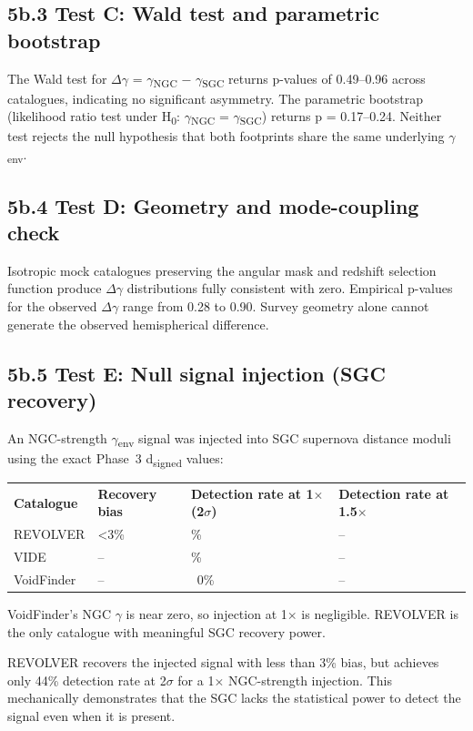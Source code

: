 \documentclass[11pt,a4paper]{article}
\begin{document}
\subsection{5b.3 Test C: Wald test and parametric bootstrap}
The Wald test for $\Delta$$\gamma$ = $\gamma$\textsubscript{NGC} $-$ $\gamma$\textsubscript{SGC} returns p-values of 0.49--0.96 across catalogues, indicating no significant asymmetry. The parametric bootstrap (likelihood ratio test under H\textsubscript{0}: $\gamma$\textsubscript{NGC} = $\gamma$\textsubscript{SGC}) returns p = 0.17--0.24. Neither test rejects the null hypothesis that both footprints share the same underlying $\gamma$\textsubscript{env}.

\subsection{5b.4 Test D: Geometry and mode-coupling check}
Isotropic mock catalogues preserving the angular mask and redshift selection function produce $\Delta$$\gamma$ distributions fully consistent with zero. Empirical p-values for the observed $\Delta$$\gamma$ range from 0.28 to 0.90. Survey geometry alone cannot generate the observed hemispherical difference.

\subsection{5b.5 Test E: Null signal injection (SGC recovery)}
An NGC-strength $\gamma$\textsubscript{env} signal was injected into SGC supernova distance moduli using the exact Phase~3 d\textsubscript{signed} values:

\begin{table}[H]
\centering
\footnotesize
\begin{tabularx}{\linewidth}{l>{\RaggedRight\arraybackslash}X>{\RaggedRight\arraybackslash}X>{\RaggedRight\arraybackslash}X}
\toprule
\textbf{Catalogue} & \textbf{Recovery bias} & \textbf{Detection rate at 1$\times$ (2$\sigma$)} & \textbf{Detection rate at 1.5$\times$} \tabularnewline
REVOLVER & <3\% & 44\% & -- \tabularnewline
VIDE & -- & 16\% & -- \tabularnewline
VoidFinder & -- & \ {}0\% & -- \tabularnewline
\bottomrule
\end{tabularx}
\end{table}

VoidFinder's NGC $\gamma$ is near zero, so injection at 1$\times$ is negligible. REVOLVER is the only catalogue with meaningful SGC recovery power.

REVOLVER recovers the injected signal with less than 3\% bias, but achieves only 44\% detection rate at 2$\sigma$ for a 1$\times$ NGC-strength injection. This mechanically demonstrates that the SGC lacks the statistical power to detect the signal even when it is present.
\end{document}
